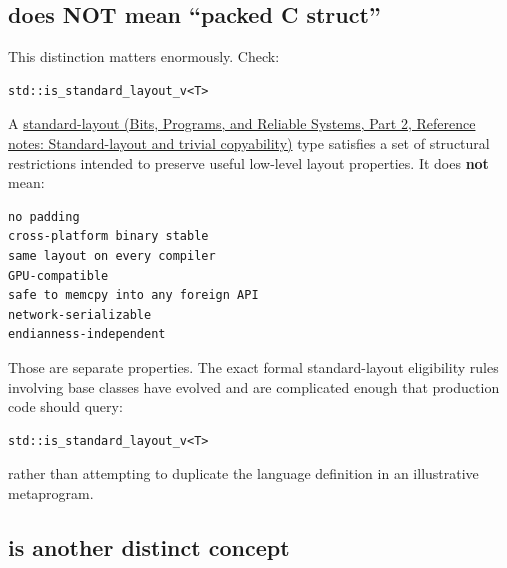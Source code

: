 \subsection{\texorpdfstring{ does NOT mean ``packed C struct''}{ does NOT mean ``packed C struct''}}\label{05-engine-i-ch003-standard-layout-does-not-mean-packed-c-struct}

\hypertarget{05-engine-i-ch003-standard-layout-does-not-mean-packed-c-struct}{}

This distinction matters enormously. Check:

\begin{verbatim}
std::is_standard_layout_v<T>
\end{verbatim}

A \href{../01-Bits-Programs-and-Reliable-Systems-P02/main.pdf\#appendix-958870a64c53}{standard-layout (Bits, Programs, and Reliable Systems, Part 2, Reference notes: Standard-layout and trivial copyability)} type satisfies a set of structural restrictions intended to preserve useful low-level layout properties. It does \textbf{not} mean:

\begin{verbatim}
no padding
cross-platform binary stable
same layout on every compiler
GPU-compatible
safe to memcpy into any foreign API
network-serializable
endianness-independent
\end{verbatim}

Those are separate properties. The exact formal standard-layout eligibility rules involving base classes have evolved and are complicated enough that production code should query:

\begin{verbatim}
std::is_standard_layout_v<T>
\end{verbatim}

rather than attempting to duplicate the language definition in an illustrative metaprogram.

\subsection{\texorpdfstring{ is another distinct concept}{ is another distinct concept}}\label{05-engine-i-ch003-trivially_copyable-is-another-distinct-concept}

\hypertarget{05-engine-i-ch003-trivially_copyable-is-another-distinct-concept}{}

